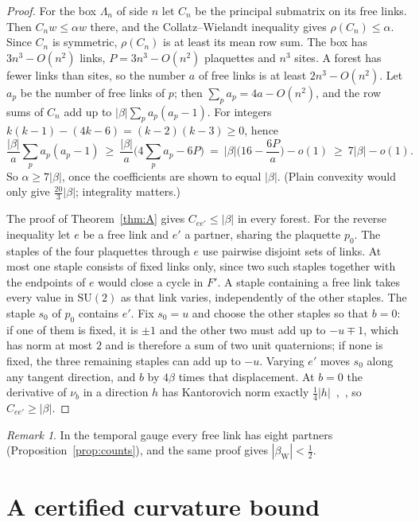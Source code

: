 \documentclass[11pt]{amsart}
\theoremstyle{definition}
\theoremstyle{remark}
\newtheorem{remark}[theorem]{Remark}
\newcommand{\SU}{\mathrm{SU}}
\begin{document}
\begin{proof}
For the box $\Lambda_n$ of side $n$ let $C_n$ be the principal submatrix on its free links. Then $C_nw\le\alpha w$
there, and the Collatz--Wielandt inequality gives $\rho(C_n)\le\alpha$. Since $C_n$ is symmetric, $\rho(C_n)$ is at
least its mean row sum. The box has $3n^3-O(n^2)$ links, $P=3n^3-O(n^2)$ plaquettes and $n^3$ sites. A forest has
fewer links than sites, so the number $a$ of free links is at least $2n^3-O(n^2)$. Let $a_p$ be the number of free
links of $p$; then $\sum_pa_p=4a-O(n^2)$, and the row sums of $C_n$ add up to $|\beta|\sum_pa_p(a_p-1)$. For integers
$k(k-1)-(4k-6)=(k-2)(k-3)\ge0$, hence
\[
\frac{|\beta|}a\sum_pa_p(a_p-1)\ \ge\ \frac{|\beta|}a\big(4\textstyle\sum_pa_p-6P\big)
\ =\ |\beta|\Big(16-\frac{6P}a\Big)-o(1)\ \ge\ 7|\beta|-o(1).
\]
So $\alpha\ge7|\beta|$, once the coefficients are shown to equal $|\beta|$. (Plain convexity would only give
$\frac{20}3|\beta|$; integrality matters.)

The proof of Theorem~\ref{thm:A} gives $C_{ee'}\le|\beta|$ in every forest. For the reverse inequality let $e$ be a
free link and $e'$ a partner, sharing the plaquette $p_0$. The staples of the four plaquettes through $e$ use pairwise
disjoint sets of links. At most one staple consists of fixed links only, since two such staples together with the
endpoints of $e$ would close a cycle in $F'$. A staple containing a free link takes every value in $\SU(2)$ as that
link varies, independently of the other staples. The staple $s_0$ of $p_0$ contains $e'$. Fix $s_0=u$ and choose the
other staples so that $b=0$: if one of them is fixed, it is $\pm1$ and the other two must add up to $-u\mp1$, which has
norm at most $2$ and is therefore a sum of two unit quaternions; if none is fixed, the three remaining staples can
add up to $-u$. Varying $e'$ moves $s_0$ along any tangent direction, and $b$ by $4\beta$ times that displacement. At
$b=0$ the derivative of $\nu_b$ in a direction $h$ has Kantorovich norm exactly
$\frac14|h|$~\cite{BB-zen},~\cite[Thm.~91]{BBL}, so $C_{ee'}\ge|\beta|$.
\end{proof}

\begin{remark}\label{rem:temporal}
In the temporal gauge every free link has eight partners (Proposition~\ref{prop:counts}), and the same proof gives
$|\beta_{\mathrm W}|<\frac12$.
\end{remark}

\section{A certified curvature bound}\label{sec:cert}
\end{document}
